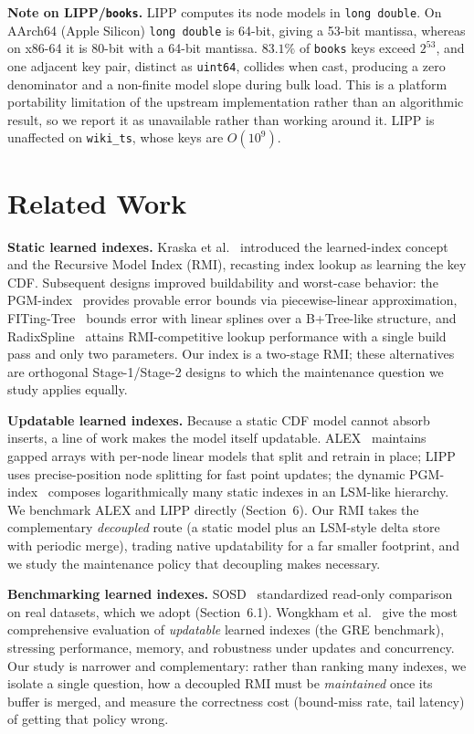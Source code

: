 \documentclass[sigconf,nonacm]{acmart}
\begin{document}
\medskip
\noindent\textbf{Note on LIPP/\texttt{books}.} LIPP computes its node models in \texttt{long double}. On AArch64 (Apple Silicon) \texttt{long double} is 64-bit, giving a 53-bit mantissa, whereas on x86-64 it is 80-bit with a 64-bit mantissa. $83.1\%$ of \texttt{books} keys exceed $2^{53}$, and one adjacent key pair, distinct as \texttt{uint64}, collides when cast, producing a zero denominator and a non-finite model slope during bulk load. This is a platform portability limitation of the upstream implementation rather than an algorithmic result, so we report it as unavailable rather than working around it. LIPP is unaffected on \texttt{wiki\_ts}, whose keys are $O(10^9)$.

\section{Related Work}

\noindent\textbf{Static learned indexes.} Kraska et al.~\cite{kraska2018case} introduced the learned-index concept and the Recursive Model Index (RMI), recasting index lookup as learning the key CDF. Subsequent designs improved buildability and worst-case behavior: the PGM-index~\cite{ferragina2020pgm} provides provable error bounds via piecewise-linear approximation, FITing-Tree~\cite{galakatos2019fiting} bounds error with linear splines over a B+Tree-like structure, and RadixSpline~\cite{kipf2020radixspline} attains RMI-competitive lookup performance with a single build pass and only two parameters. Our index is a two-stage RMI; these alternatives are orthogonal Stage-1/Stage-2 designs to which the maintenance question we study applies equally.

\noindent\textbf{Updatable learned indexes.} Because a static CDF model cannot absorb inserts, a line of work makes the model itself updatable. ALEX~\cite{ding2020alex} maintains gapped arrays with per-node linear models that split and retrain in place; LIPP~\cite{wu2021lipp} uses precise-position node splitting for fast point updates; the dynamic PGM-index~\cite{ferragina2020pgm} composes logarithmically many static indexes in an LSM-like hierarchy. We benchmark ALEX and LIPP directly (Section~6). Our RMI takes the complementary \emph{decoupled} route (a static model plus an LSM-style delta store~\cite{oneil1996log} with periodic merge), trading native updatability for a far smaller footprint, and we study the maintenance policy that decoupling makes necessary.

\noindent\textbf{Benchmarking learned indexes.} SOSD~\cite{marcus2020benchmarking} standardized read-only comparison on real datasets, which we adopt (Section~6.1). Wongkham et al.~\cite{wongkham2022updatable} give the most comprehensive evaluation of \emph{updatable} learned indexes (the GRE benchmark), stressing performance, memory, and robustness under updates and concurrency. Our study is narrower and complementary: rather than ranking many indexes, we isolate a single question, how a decoupled RMI must be \emph{maintained} once its buffer is merged, and measure the correctness cost (bound-miss rate, tail latency) of getting that policy wrong.
\end{document}
